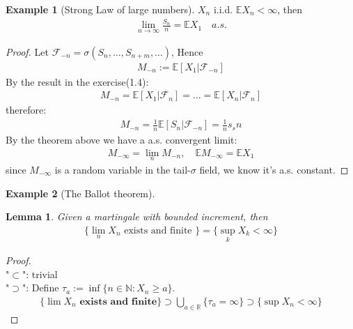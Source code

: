 \documentclass[a4paper,11pt]{book}
\newtheorem{lemma}[theorem]{Lemma}
\theoremstyle{definition}
\newtheorem*{example}{Example}
\theoremstyle{remark}
\begin{document}
\begin{example}[Strong Law of large numbers]
$X_n$ i.i.d. $\mathbb{E}X_n < \infty$, then
\begin{align*}
	\lim_{n \rightarrow \infty} \frac{S_n}{n}  = \mathbb{E}X_1 \quad a.s.
\end{align*}

\end{example}
\begin{proof}
	Let $\mathcal{F}_{-n} = \sigma(S_{n}, \dots, S_{n + m}, \dots)$, 
	Hence
	\begin{align*}
		M_{-n} := \mathbb{E}[X_1|\mathcal{F}_{-n}]
	\end{align*}
	By the result in the exercise(1.4):
	\begin{align*}
		M_{-n} = \mathbb{E}[X_1|\mathcal{F}_n] = \dots =\mathbb{E}[X_n |\mathcal{F}_n]
	\end{align*}
	therefore:
	\begin{align*}
		M_{-n} = \frac{1}{n}\mathbb{E}[S_n|\mathcal{F}_{-n}] = \frac{1}{n}s_sn
	\end{align*}
	By the theorem above we have a a.s. convergent limit:
	\begin{align*}
		M_{-\infty} = \lim_{n} M_{-n}, \quad \mathbb{E}M_{-\infty} = \mathbb{E}X_1 
	\end{align*}
	since $M_{-\infty}$ is a random variable in the tail-$\sigma$ field, we know it's a.s. constant.
\end{proof}



\begin{example}[The Ballot theorem]
	
\end{example}


\begin{lemma}
	Given a martingale with bounded increment, then
\begin{align*}
	\{\lim_n X_n \text{ exists and finite }\} = \{\sup_k X_k < \infty\}
\end{align*}
\end{lemma}
\begin{proof}\quad\\
"$\subset$": trivial\\
"$\supset$": Define $\tau_a:= \inf \{n \in \mathbb{N}: X_n \geq a\}$. 
\begin{align*}
	\{ \lim X_n \textbf{ exists and finite} \} \supset \bigcup_{a \in \mathbb{R}} \{\tau_a = \infty\} \supset \{\sup X_n < \infty \}
\end{align*}
\end{proof}
\end{document}
